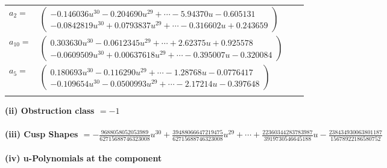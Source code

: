 \documentclass[1p]{elsarticle_modified}
\theoremstyle{definition}
\begin{document}
\begin{tabular}{m{7pt} m{180pt} m{7pt} m{180pt} }
\flushright $a_{2}=$&$\begin{pmatrix}-0.146036 u^{30}-0.204690 u^{29}+\cdots-5.94370 u-0.605131\\-0.0842819 u^{30}+0.0793837 u^{29}+\cdots-0.316602 u+0.243659\end{pmatrix}$ \\
\flushright $a_{10}=$&$\begin{pmatrix}0.303630 u^{30}-0.0612345 u^{29}+\cdots+2.62375 u+0.925578\\-0.0609509 u^{30}+0.00637618 u^{29}+\cdots-0.395007 u-0.320084\end{pmatrix}$ \\
\flushright $a_{5}=$&$\begin{pmatrix}0.180693 u^{30}-0.116290 u^{29}+\cdots-1.28768 u-0.0776417\\-0.109654 u^{30}-0.0500993 u^{29}+\cdots-2.17214 u-0.397648\end{pmatrix}$\\&\end{tabular}
\flushleft \textbf{(ii) Obstruction class $= -1$}\\~\\
\flushleft \textbf{(iii) Cusp Shapes $= -\frac{9688058052053989}{62715688746323008} u^{30}+\frac{39488066647219475}{62715688746323008} u^{29}+\cdots+\frac{22360344283783987}{3919730546645188} u-\frac{238434930063801187}{15678922186580752}$}\\~\\
\newpage\renewcommand{\arraystretch}{1}
\flushleft \textbf{(iv) u-Polynomials at the component}\newline \\
\end{document}
